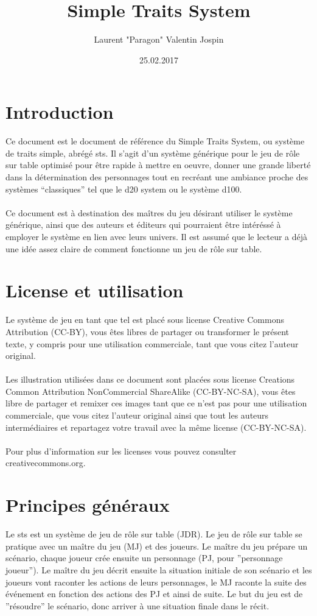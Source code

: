 \documentclass[a4paper,10pt,twoside,twocolumn]{article}
\author{Laurent "Paragon" Valentin Jospin}
\title{Simple Traits System}
\date{25.02.2017}
\begin{document}
  \maketitle
 
 \section{Introduction}
 
 Ce document est le document de référence du Simple Traits System, ou système de traits simple, abrégé sts. Il s'agit d'un système générique pour le jeu de rôle sur table optimisé pour être rapide à mettre en oeuvre, donner une grande liberté dans la détermination des personnages tout en recréant une ambiance proche des systèmes ``classiques'' tel que le d20 system ou le système d100.\\
 \\
 Ce document est à destination des maîtres du jeu désirant utiliser le système générique, ainsi que des auteurs et éditeurs qui pourraient être intéréssé à employer le système en lien avec leurs univers. Il est assumé que le lecteur a déjà une idée assez claire de comment fonctionne un jeu de rôle sur table.
 
 \section{License et utilisation}
 
 Le système de jeu en tant que tel est placé sous license Creative Commons Attribution (CC-BY), vous êtes libres de partager ou transformer le présent texte, y compris pour une utilisation commerciale, tant que vous citez l'auteur original.\\
 \\
 Les illustration utilisées dans ce document sont placées sous license Creations Common Attribution NonCommercial ShareAlike (CC-BY-NC-SA), vous êtes libre de partager et remixer ces images tant que ce n'est pas pour une utilisation commerciale, que vous citez l'auteur original ainsi que tout les auteurs intermédiaires et repartagez votre travail avec la même license (CC-BY-NC-SA).\\
 \\
 Pour plus d'information sur les licenses vous pouvez consulter creativecommons.org.
 
 \section{Principes généraux}
 \label{princip}
 Le sts est un système de jeu de rôle sur table (JDR). Le jeu de rôle sur table se pratique avec un maître du jeu (MJ) et des joueurs. Le maître du jeu prépare un scénario, chaque joueur crée ensuite un personnage (PJ, pour ''personnage joueur''). Le maître du jeu décrit ensuite la situation initiale de son scénario et les joueurs vont raconter les actions de leurs personnages, le MJ raconte la suite des événement en fonction des actions des PJ et ainsi de suite. Le but du jeu est de ''résoudre'' le scénario, donc arriver à une situation finale dans le récit.
 
\end{document}
